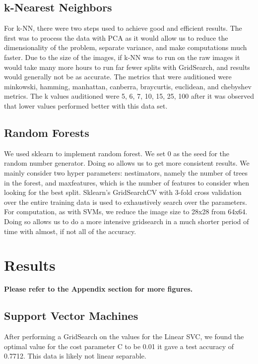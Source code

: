 \documentclass[twoside,twocolumn]{article}
\begin{document}
\subsection{k-Nearest Neighbors}
For k-NN, there were two steps used to achieve good and efficient results. The first was to process the data with PCA as it would allow us to reduce the dimensionality of the problem, separate variance, and make computations much faster. Due to the size of the images, if k-NN was to run on the raw images it would take many more hours to run far fewer splits with GridSearch, and results would generally not be as accurate. The metrics that were auditioned were minkowski, hamming, manhattan, canberra, braycurtis, euclidean, and chebyshev metrics. The k values auditioned were 5, 6, 7, 10, 15, 25, 100 after it was observed that lower values performed better with this data set.
\subsection{Random Forests}
We used sklearn to implement random forest. We set 0 as the seed for the random number generator. Doing so allows us to get more consistent results. We mainly consider two hyper parameters: n\textunderscore estimators, namely the number of trees in the forest, and max\textunderscore features, which is the number of features to consider when looking for the best split. Sklearn's GridSearchCV with 3-fold cross validation over the entire training data is used to exhaustively search over the parameters. For computation, as with SVMs, we reduce the image size to 28x28 from 64x64. Doing so allows us to do a more intensive gridsearch in a much shorter period of time with almost, if not all of the accuracy.


\section{Results}
\textbf{Please refer to the Appendix section for more figures.}
\subsection{Support Vector Machines}
After performing a GridSearch on the values for the Linear SVC, we found the optimal value for the cost parameter C to be 0.01 it gave a test accuracy of 0.7712. This data is likely not linear separable. 
\end{document}
